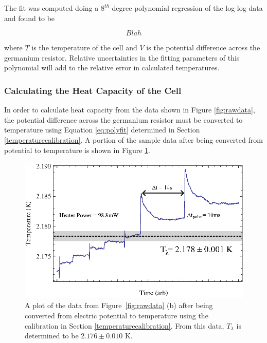 The fit was computed doing a $8^{th}$-degree polynomial regression of the log-log data and found to be 

\begin{center}
\begin{equation}\label{eq:polyfit}
Blah
\end{equation}
\end{center}
where $T$ is the temperature of the cell and $V$ is the potential difference across the germanium resistor.  Relative uncertainties in the fitting parameters of this polynomial will add to the relative error in calculated temperatures.   

\subsubsection{Calculating the Heat Capacity of the Cell}\label{calculatingtheheatcapacityofthecell}

In order to calculate heat capacity from the data shown in Figure \ref{fig:rawdata}, the potential difference across the germanium resistor must be converted to temperature using Equation \ref{eq:polyfit} determined in Section \ref{temperaturecalibration}. A portion of the sample data after being converted from potential to temperature is shown in Figure \ref{fig:heatingdata}.  

\begin{figure}[htbp]
\begin{center}
\includegraphics[height=70mm]{./figures/heatingdata.eps}
\caption{\small{A plot of the data from Figure~\ref{fig:rawdata} (b) after being converted from electric potential to temperature using the calibration in Section \ref{temperaturecalibration}.  From this data, $T_{\lambda}$ is determined to be $2.176\pm0.010$ K.}}
\label{fig:heatingdata}
\end{center}
\end{figure}

